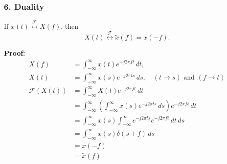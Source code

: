 \subsubsection{6. Duality}
\begin{definition}
    If \( x(t) \overset{\mathcal{F}}{\leftrightarrow} X(f) \), then
    \[
    X(t) \overset{\mathcal{F}}{\leftrightarrow} \tilde{x}(f) = x(-f).
    \]
\end{definition}

\begin{derivation}
    \textbf{Proof:}
    \begin{align*}
    X(f) &= \int_{-\infty}^{\infty} x(t) e^{-j 2 \pi f t} \, dt, \\
    X(t) &= \int_{-\infty}^{\infty} x(s) e^{-j 2 \pi t s} \, ds, \quad (t \rightarrow s) \text{ and } (f \rightarrow t) \\
    \mathcal{F}(X(t)) &= \int_{-\infty}^{\infty} X(t) e^{-j 2 \pi f t} \, dt \\
    &= \int_{-\infty}^{\infty} \left( \int_{-\infty}^{\infty} x(s) e^{-j 2 \pi t s} \, ds \right) e^{-j 2 \pi f t} \, dt \\
    &= \int_{-\infty}^{\infty} x(s) \int_{-\infty}^{\infty} e^{-j 2 \pi t s}  e^{-j 2 \pi f t} \, dt \, ds \\
    &= \int_{-\infty}^{\infty} x(s) \delta(s + f) \, ds \\
    &= x(-f) \\
    &= \tilde{x}(f)
    \end{align*}
\end{derivation}

